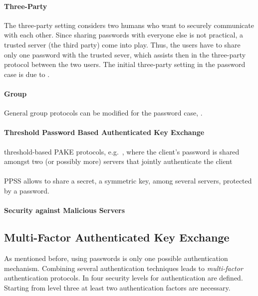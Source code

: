 \paragraph{Three-Party }
The three-party setting considers two humans who want to securely communicate with each other.
Since sharing passwords with everyone else is not practical, a trusted server (the third party) come into play.
Thus, the users have to share only one password with the trusted sever, which assists then in the three-party protocol between the two users.
The initial three-party setting in the password case is due to \citeauthor{Abdalla2005} \cite{Abdalla2005}.

\paragraph{Group }
General group protocols can be modified for the password case, \eg \cite{Bresson02,BrChPo05}.

\paragraph{Threshold Password Based Authenticated Key Exchange}
threshold-based PAKE protocols, e.g.~\cite{Abdalla2005b}, where the client's password is shared amongst two (or possibly more) servers that jointly authenticate the client

\paragraph{}
\ac{PPSS} allows to share a secret, \eg a symmetric key, among several servers, protected by a password. \cite{Bagherzandi2011}

\paragraph{Security against Malicious Servers}

\subsection{Multi-Factor Authenticated Key Exchange}
As mentioned before, using passwords is only one possible authentication mechanism.
Combining several authentication techniques leads to \emph{multi-factor} authentication protocols.
In \cite{Burr11} four security levels for authentication are defined.
Starting from level three at least two authentication factors are necessary.

